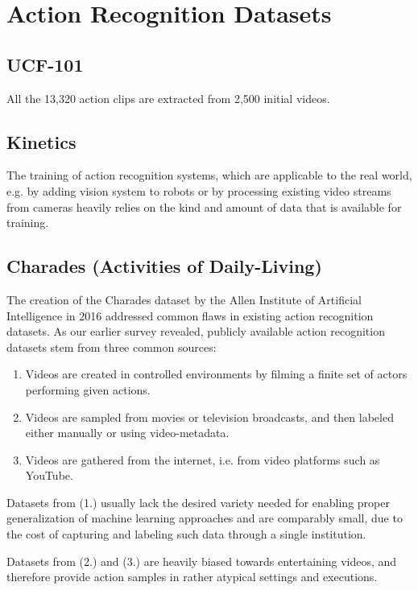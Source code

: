 \section{Action Recognition Datasets}

\subsection{UCF-101}

All the 13,320 action clips are extracted from 2,500 initial videos.


\subsection{Kinetics}

The training of action recognition systems, which are applicable to the real world, e.g. by adding vision system to robots or by processing existing video streams from cameras heavily relies on the kind and amount of data that is available for training.


\subsection{Charades (Activities of Daily-Living)}

The creation of the Charades dataset \cite{sigurdsson_hollywood_2016} by the Allen Institute of Artificial Intelligence in 2016 addressed common flaws in existing action recognition datasets.
As our earlier survey revealed, publicly available action recognition datasets stem from three common sources:
\begin{enumerate}
    \item Videos are created in controlled environments by filming a finite set of actors performing given actions.
    \item Videos are sampled from movies or television broadcasts, and then labeled either manually or using video-metadata.
    \item Videos are gathered from the internet, i.e. from video platforms such as YouTube.
\end{enumerate}

Datasets from (1.) usually lack the desired variety needed for enabling proper generalization of machine learning approaches and are comparably small, due to the cost of capturing and labeling such data through a single institution.

Datasets from (2.) and (3.) are heavily biased towards entertaining videos, and therefore provide action samples in rather atypical settings and executions.

